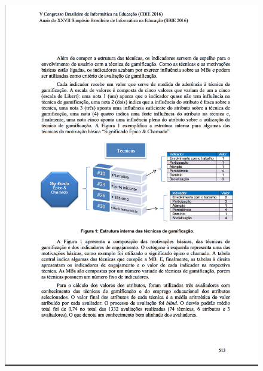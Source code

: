 \begin{apendicesenv}
\begin{figure}[h]
	\centering
		\includegraphics[keepaspectratio=true,scale=0.6]{figuras/a4.png}
\end{figure}


\end{apendicesenv}

